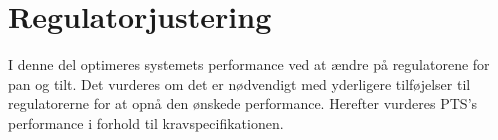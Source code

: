 \part{Regulatorjustering}
I denne del optimeres systemets performance ved at ændre på regulatorene for pan og tilt. 
Det vurderes om det er nødvendigt med yderligere tilføjelser til regulatorerne 
for at opnå den ønskede performance.
Herefter vurderes PTS's performance i forhold til kravspecifikationen.

%
